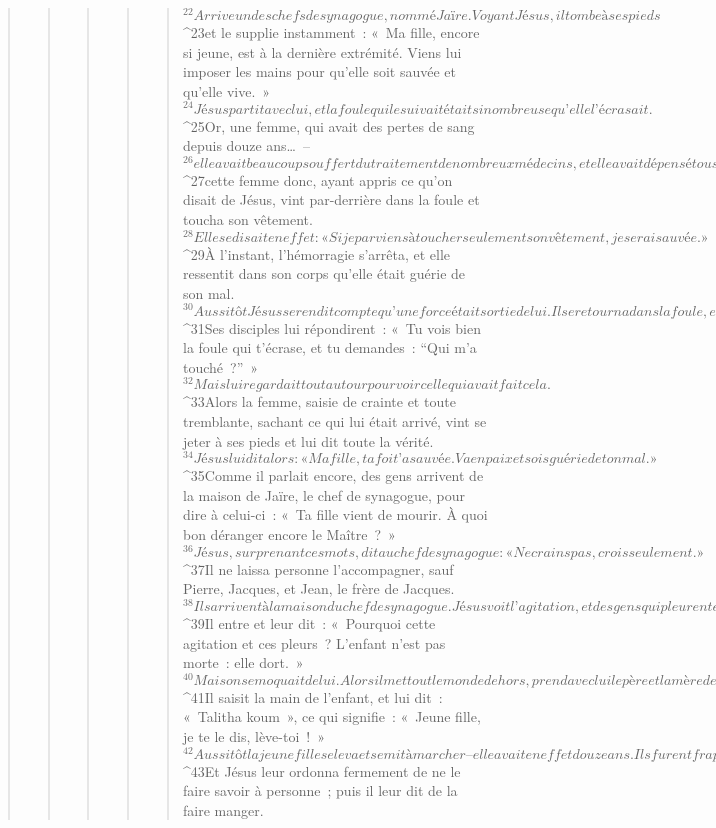 \begin{verse}
\begin{verse}
\begin{verse}
\begin{verse}
\begin{verse}
${}^{22}Arrive un des chefs de synagogue, nommé Jaïre. Voyant Jésus, il tombe à ses pieds 
${}^{23}et le supplie instamment : « Ma fille, encore si jeune, est à la dernière extrémité. Viens lui imposer les mains pour qu’elle soit sauvée et qu’elle vive. » 
${}^{24}Jésus partit avec lui, et la foule qui le suivait était si nombreuse qu’elle l’écrasait.
${}^{25}Or, une femme, qui avait des pertes de sang depuis douze ans… – 
${}^{26}elle avait beaucoup souffert du traitement de nombreux médecins, et elle avait dépensé tous ses biens sans avoir la moindre amélioration ; au contraire, son état avait plutôt empiré – … 
${}^{27}cette femme donc, ayant appris ce qu’on disait de Jésus, vint par-derrière dans la foule et toucha son vêtement. 
${}^{28}Elle se disait en effet : « Si je parviens à toucher seulement son vêtement, je serai sauvée. » 
${}^{29}À l’instant, l’hémorragie s’arrêta, et elle ressentit dans son corps qu’elle était guérie de son mal.
${}^{30}Aussitôt Jésus se rendit compte qu’une force était sortie de lui. Il se retourna dans la foule, et il demandait : « Qui a touché mes vêtements ? » 
${}^{31}Ses disciples lui répondirent : « Tu vois bien la foule qui t’écrase, et tu demandes : “Qui m’a touché ?” » 
${}^{32}Mais lui regardait tout autour pour voir celle qui avait fait cela. 
${}^{33}Alors la femme, saisie de crainte et toute tremblante, sachant ce qui lui était arrivé, vint se jeter à ses pieds et lui dit toute la vérité. 
${}^{34}Jésus lui dit alors : « Ma fille, ta foi t’a sauvée. Va en paix et sois guérie de ton mal. »
${}^{35}Comme il parlait encore, des gens arrivent de la maison de Jaïre, le chef de synagogue, pour dire à celui-ci : « Ta fille vient de mourir. À quoi bon déranger encore le Maître ? » 
${}^{36}Jésus, surprenant ces mots, dit au chef de synagogue : « Ne crains pas, crois seulement. »
${}^{37}Il ne laissa personne l’accompagner, sauf Pierre, Jacques, et Jean, le frère de Jacques. 
${}^{38}Ils arrivent à la maison du chef de synagogue. Jésus voit l’agitation, et des gens qui pleurent et poussent de grands cris. 
${}^{39}Il entre et leur dit : « Pourquoi cette agitation et ces pleurs ? L’enfant n’est pas morte : elle dort. » 
${}^{40}Mais on se moquait de lui. Alors il met tout le monde dehors, prend avec lui le père et la mère de l’enfant, et ceux qui étaient avec lui ; puis il pénètre là où reposait l’enfant. 
${}^{41}Il saisit la main de l’enfant, et lui dit : « Talitha koum », ce qui signifie : « Jeune fille, je te le dis, lève-toi ! » 
${}^{42}Aussitôt la jeune fille se leva et se mit à marcher – elle avait en effet douze ans. Ils furent frappés d’une grande stupeur. 
${}^{43}Et Jésus leur ordonna fermement de ne le faire savoir à personne ; puis il leur dit de la faire manger.
      

\end{verse}
\end{verse}
\end{verse}
\end{verse}
\end{verse}

